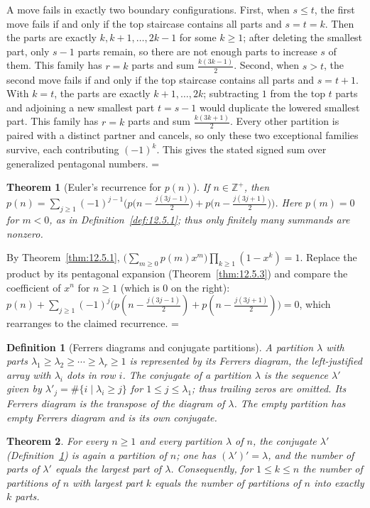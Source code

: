 \documentclass[11pt]{article}
\makeatletter
\theoremstyle{ntstyle}
\newtheorem{theorem}{Theorem}[subsection]
\newtheorem{definition}{Definition}[subsection]
\let\nt@closedisplay\]
\def\nt@guardedclose{\@ifnextchar\par{\nt@closeafterpar}{\@ifnextchar\end{\postdisplaypenalty\@M\nt@closedisplay}{\nt@closedisplay}}}
\def\nt@closeafterpar\par{\@ifnextchar\par{\nt@closeafterpar}{\@ifnextchar\end{\postdisplaypenalty\@M\nt@closedisplay\par}{\nt@closedisplay\par}}}
\renewenvironment{proof}[1][\proofname]{\par
  \pushQED{\qed}\normalfont\topsep\medskipamount\edef\nt@afterproof{\@endparpenalty=\the\@endparpenalty\relax}\@beginparpenalty\@M\@endparpenalty\@M\let\]\nt@guardedclose\trivlist\item[]\textit{#1\@addpunct{.}} \ignorespaces}{\ifvmode\addpenalty\@M\fi\popQED\nt@afterproof\endtrivlist\@endpefalse}
\makeatother
\begin{document}
\begin{proof}
	A move fails in exactly two boundary configurations. First, when
	$s\le t$, the first move fails if and only if the top staircase
	contains all parts and $s=t=k$. Then the parts are exactly
	$k,k+1,\ldots,2k-1$ for some $k\ge1$; after deleting the smallest part,
	only $s-1$ parts remain, so there are not enough parts to increase $s$ of them.
	This family has $r=k$ parts and sum $\tfrac{k(3k-1)}{2}$. Second, when
	$s>t$, the second move fails if and only if the top staircase
	contains all parts and $s=t+1$. With $k=t$, the parts are
	exactly $k+1,\ldots,2k$; subtracting $1$ from the top $t$ parts
	and adjoining a new smallest part $t=s-1$ would duplicate the
	lowered smallest part. This family has $r=k$ parts and sum
	$\tfrac{k(3k+1)}{2}$. Every other partition is
	paired with a distinct partner and cancels, so only these two
	exceptional families survive, each contributing $(-1)^k$. This gives
	the stated signed sum over generalized pentagonal numbers.
\end{proof}
\begin{theorem}[Euler's recurrence for $p(n)$]\label{thm:12.5.4} If $n\in\mathbb{Z}^+$, then
	$p(n)=\sum_{j\ge1}(-1)^{j-1}\Big(p\big(n-\tfrac{j(3j-1)}{2}\big)+p\big(n-\tfrac{j(3j+1)}{2}\big)\Big)$.
	Here $p(m)=0$ for $m<0$, as in Definition~\ref{def:12.5.1}; thus only
	finitely many summands are nonzero.
\end{theorem}

\begin{proof} By Theorem~\ref{thm:12.5.1},
	$\big(\sum_{m\ge0}p(m)x^m\big)\prod_{k\ge1}(1-x^k)=1$. Replace the
	product by its pentagonal expansion (Theorem~\ref{thm:12.5.3}) and compare the
	coefficient of $x^n$ for $n\ge1$ (which is $0$ on the right):
	$p(n)+\sum_{j\ge1}(-1)^j\big(p(n-\tfrac{j(3j-1)}{2})+p(n-\tfrac{j(3j+1)}{2})\big)=0$,
	which rearranges to the claimed recurrence.
\end{proof}
\begin{definition}[Ferrers diagrams and conjugate partitions]
	\label{def:12.5.2} A partition
	$\lambda$ with parts $\lambda_1\ge\lambda_2\ge\cdots\ge\lambda_r\ge1$
	is represented by its Ferrers diagram, the left-justified array with
	$\lambda_i$ dots in row $i$.
	The conjugate of a partition $\lambda$ is the sequence $\lambda'$ given by
	$\lambda'_j=\#\{i \mid \lambda_i\ge j\}$ for
	$1\le j\le\lambda_1$; thus trailing zeros are omitted. Its Ferrers
	diagram is the transpose of the diagram of $\lambda$. The empty
	partition has empty Ferrers diagram and is its own conjugate.
\end{definition}
\begin{theorem}\label{thm:12.5.5} For every $n\ge1$ and every partition
	$\lambda$ of $n$, the conjugate $\lambda'$ (Definition~\ref{def:12.5.2}) is again a partition of $n$; one has
	$(\lambda')' = \lambda$, and the number of parts of $\lambda'$ equals
	the largest part of $\lambda$. Consequently, for $1\le k\le n$ the
	number of partitions of $n$ with largest part $k$ equals the number
	of partitions of $n$ into exactly $k$ parts.
\end{theorem}
\end{document}

